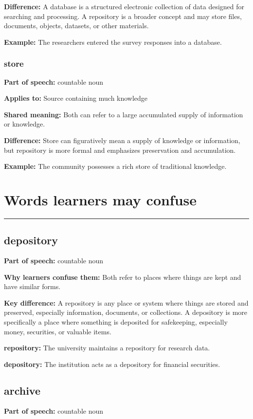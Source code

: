 \documentclass[11pt]{article}
\newcommand{\sectionrule}{\par\vspace{-0.5em}\noindent\textcolor{Accent}{\rule{\linewidth}{0.6pt}}\par}
\begin{document}
\textbf{Difference:} A database is a structured electronic collection of data designed for searching and processing. A repository is a broader concept and may store files, documents, objects, datasets, or other materials.

\textbf{Example:} The researchers entered the survey responses into a database.

\subsubsection{store}
\textbf{Part of speech:} countable noun

\textbf{Applies to:} Source containing much knowledge

\textbf{Shared meaning:} Both can refer to a large accumulated supply of information or knowledge.

\textbf{Difference:} Store can figuratively mean a supply of knowledge or information, but repository is more formal and emphasizes preservation and accumulation.

\textbf{Example:} The community possesses a rich store of traditional knowledge.

\section{Words learners may confuse}
\sectionrule
\subsection{depository}
\textbf{Part of speech:} countable noun

\textbf{Why learners confuse them:} Both refer to places where things are kept and have similar forms.

\textbf{Key difference:} A repository is any place or system where things are stored and preserved, especially information, documents, or collections. A depository is more specifically a place where something is deposited for safekeeping, especially money, securities, or valuable items.

\textbf{repository:} The university maintains a repository for research data.

\textbf{depository:} The institution acts as a depository for financial securities.

\subsection{archive}
\textbf{Part of speech:} countable noun
\end{document}
